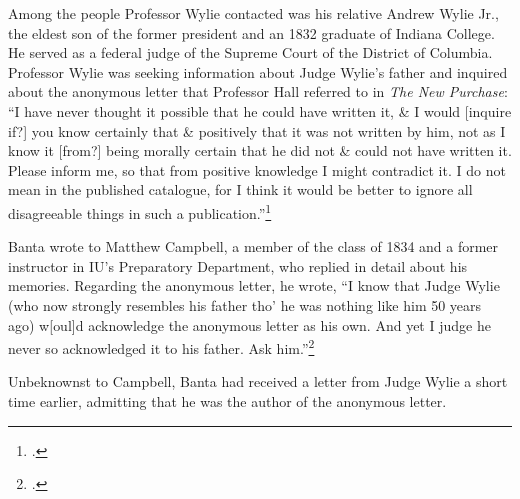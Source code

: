 \documentclass[
  american,
  letterpaper,
]{scrreprt}
\begin{document}
Among the people Professor Wylie contacted was his relative Andrew Wylie
Jr., the eldest son of the former president and an 1832 graduate of
Indiana College. He served as a federal judge of the Supreme Court of
the District of Columbia. Professor Wylie was seeking information about
Judge Wylie's father and inquired about the anonymous letter that
Professor Hall referred to in \emph{The New Purchase}: ``I have never
thought it possible that he could have written it, \& I would {[}inquire
if?{]} you know certainly that \& positively that it was not written by
him, not as I know it {[}from?{]} being morally certain that he did not
\& could not have written it. Please inform me, so that from positive
knowledge I might contradict it. I do not mean in the published
catalogue, for I think it would be better to ignore all disagreeable
things in such a publication.''\footnote{.}

Banta wrote to Matthew Campbell, a member of the class of 1834 and a
former instructor in IU's Preparatory Department, who replied in detail
about his memories. Regarding the anonymous letter, he wrote, ``I know
that Judge Wylie (who now strongly resembles his father tho' he was
nothing like him 50 years ago) w{[}oul{]}d acknowledge the anonymous
letter as his own. And yet I judge he never so acknowledged it to his
father. Ask him.''\footnote{.}

Unbeknownst to Campbell, Banta had received a letter from Judge Wylie a
short time earlier, admitting that he was the author of the anonymous
letter.
\end{document}
